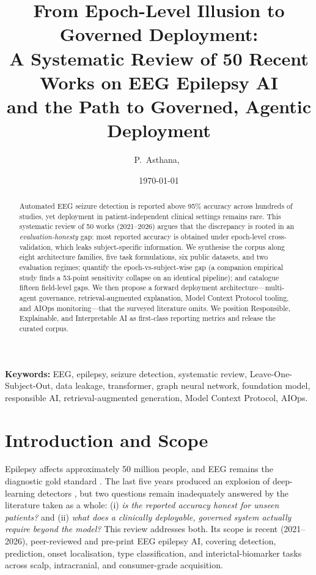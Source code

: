 \documentclass[10pt,journal,twocolumn]{IEEEtran}
\title{\textbf{From Epoch-Level Illusion to Governed Deployment:\\ A Systematic Review of 50 Recent Works on EEG Epilepsy AI\\ and the Path to Governed, Agentic Deployment}}
\author{P.~Asthana,~\IEEEmembership{NeuroAI Research Group}}
\date{\today}
\begin{document}
\maketitle

\begin{abstract}
\noindent Automated EEG seizure detection is reported above 95\% accuracy across hundreds of studies, yet deployment in patient-independent clinical settings remains rare. This systematic review of 50 works (2021--2026) argues that the discrepancy is rooted in an \emph{evaluation-honesty} gap: most reported accuracy is obtained under epoch-level cross-validation, which leaks subject-specific information. We synthesise the corpus along eight architecture families, five task formulations, six public datasets, and two evaluation regimes; quantify the epoch-vs-subject-wise gap (a companion empirical study finds a 53-point sensitivity collapse on an identical pipeline); and catalogue fifteen field-level gaps. We then propose a forward deployment architecture---multi-agent governance, retrieval-augmented explanation, Model Context Protocol tooling, and AIOps monitoring---that the surveyed literature omits. We position Responsible, Explainable, and Interpretable AI as first-class reporting metrics and release the curated corpus.
\end{abstract}

\noindent\textbf{Keywords:} EEG, epilepsy, seizure detection, systematic review, Leave-One-Subject-Out, data leakage, transformer, graph neural network, foundation model, responsible AI, retrieval-augmented generation, Model Context Protocol, AIOps.

\section{Introduction and Scope}
Epilepsy affects approximately 50 million people, and EEG remains the diagnostic gold standard \citep{ep241003385}. The last five years produced an explosion of deep-learning detectors \citep{ep250820535,ep251108861,ep260113234}, but two questions remain inadequately answered by the literature taken as a whole: (i) \emph{is the reported accuracy honest for unseen patients?} and (ii) \emph{what does a clinically deployable, governed system actually require beyond the model?} This review addresses both. Its scope is recent (2021--2026), peer-reviewed and pre-print EEG epilepsy AI, covering detection, prediction, onset localisation, type classification, and interictal-biomarker tasks across scalp, intracranial, and consumer-grade acquisition.
\end{document}

